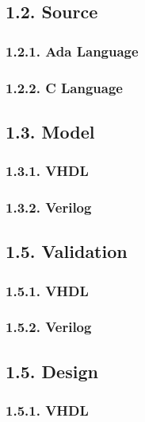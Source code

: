 \documentclass[]{article}
\begin{document}
\subsection{1.2. Source}\label{source}

\subsubsection{1.2.1. Ada Language}\label{ada-language}

\subsubsection{1.2.2. C Language}\label{c-language}

\subsection{1.3. Model}\label{model}

\subsubsection{1.3.1. VHDL}\label{vhdl}

\subsubsection{1.3.2. Verilog}\label{verilog}

\subsection{1.5. Validation}\label{validation}

\subsubsection{1.5.1. VHDL}\label{vhdl-1}

\subsubsection{1.5.2. Verilog}\label{verilog-1}

\subsection{1.5. Design}\label{design}

\subsubsection{1.5.1. VHDL}\label{vhdl-2}
\end{document}
